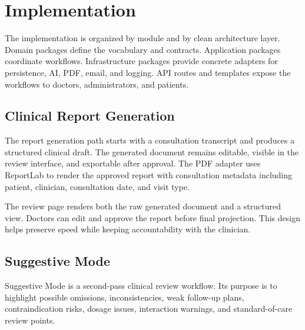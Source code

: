 \section{Implementation}

The implementation is organized by module and by clean architecture layer. Domain packages define the vocabulary and contracts. Application packages coordinate workflows. Infrastructure packages provide concrete adapters for persistence, AI, PDF, email, and logging. API routes and templates expose the workflows to doctors, administrators, and patients.

\subsection{Clinical Report Generation}

The report generation path starts with a consultation transcript and produces a structured clinical draft. The generated document remains editable, visible in the review interface, and exportable after approval. The PDF adapter uses ReportLab to render the approved report with consultation metadata including patient, clinician, consultation date, and visit type.

The review page renders both the raw generated document and a structured view. Doctors can edit and approve the report before final projection. This design helps preserve speed while keeping accountability with the clinician.

\subsection{Suggestive Mode}

Suggestive Mode is a second-pass clinical review workflow. Its purpose is to highlight possible omissions, inconsistencies, weak follow-up plans, contraindication risks, dosage issues, interaction warnings, and standard-of-care review points.

